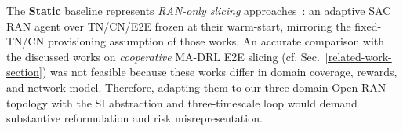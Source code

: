 \documentclass[12pt,lettersize,journal,onecolumn]{IEEEtran}
\begin{document}
The \textbf{Static} baseline represents \textit{RAN-only slicing} approaches~\cite{tvt23choi,camad24ebrahimi,jiot24filali}: an adaptive SAC RAN agent over TN/CN/E2E frozen at their warm-start, mirroring the fixed-TN/CN provisioning assumption of those works. An accurate comparison with the discussed works on \emph{cooperative} MA-DRL E2E slicing (cf. Sec.~\ref{related-work-section}) was not feasible because these works differ in domain coverage, rewards, and network model. Therefore, adapting them to our three-domain Open RAN topology with the SI abstraction and three-timescale loop would demand substantive reformulation and risk misrepresentation.
\end{document}
